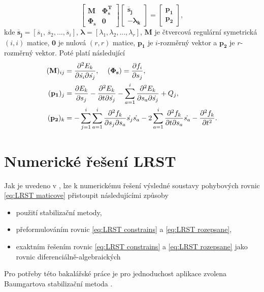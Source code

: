 \begin{equation} \label{eq:LRST maticove}
	\begin{bmatrix}
		\mathbf{M} & \mathbf{\Phi_s^T} \\
		\mathbf{\Phi_s} & \mathbf{0}
	\end{bmatrix}
	\begin{bmatrix}
		\mathbf{\ddot{s_j}}\\
		\mathbf{-\lambda_k}
	\end{bmatrix}
	=
	\begin{bmatrix}
		\mathbf{p_1}\\
		\mathbf{p_2}
	\end{bmatrix},
\end{equation}
kde $ \ddot{\mathbf{s_j}} = [\ddot{s_1}, \, \ddot{s_2},...,\ddot{s_i}]$, $ \mathbf{\lambda} = [\lambda_1, \lambda_2,...,\lambda_r] $, $ \mathbf{M} $ je čtvercová regulární symetrická $ (i,i) $ matice, $ \mathbf{0} $ je nulová $ (r,r) $ matice, $ \mathbf{p_1} $ je $ i $-rozměrný vektor a $ \mathbf{p_2} $ je $ r $-rozměrný vektor. Poté platí následující
\begin{align}
	(\mathbf{M})_{ij}&=\frac{\partial^{2}E_k}{\partial \dot{s_i} \partial \dot{s_j}}, \,\,\,\,\,\,\, (\mathbf{\Phi_s}) = \frac{\partial f_i}{\partial s_j}, \notag\\
	(\mathbf{p_1})_j &= \frac{\partial E_k}{\partial s_j} - \frac{\partial^2 E_k }{\partial t \partial \dot{s_j}}-\sum_{a=1}^{i}\frac{\partial^2 E_k}{\partial s_a \partial \dot{s_j}}+Q_j \notag,\\
	(\mathbf{p_2})_k &= - \sum_{j=1}^{i}\sum_{a=1}^{i}\frac{\partial^2 f_k}{\partial s_j \partial s_a} \dot{s_j} \dot{s_a} - 2 \sum_{a=1}^{i} \frac{\partial^2 f_k}{\partial t \partial s_a}  \dot{s_a} - \frac{\partial^2 f_k}{\partial t^2}.
\end{align}


\section{Numerické řešení LRST} \label{sec:Numer_LRST}
Jak je uvedeno v \cite{cite:bible}, lze k numerickému řešení výsledné soustavy pohybových rovnic \ref{eq:LRST maticove} přistoupit následujícími způsoby
\begin{itemize}
	\item použití stabilizační metody,
	\item přeformulováním rovnic \ref{eq:LRST constrains}  a  \ref{eq:LRST rozepsane},
	\item exaktním řešením rovnic \ref{eq:LRST constrains}  a  \ref{eq:LRST rozepsane}  jako rovnic diferenciálně-algebraických
\end{itemize}
Pro potřeby této bakalářské práce je pro jednoduchost aplikace zvolena Baumgartova stabilizační metoda \cite{cite:stabilzace_articl}.

